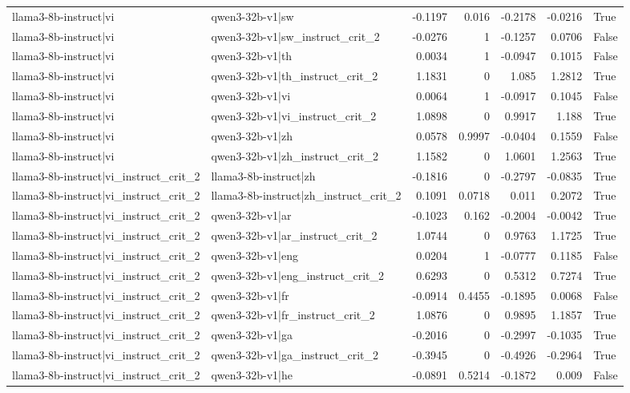 \begin{table}
\begin{tabular}{l l r r r r l}
llama3-8b-instruct|vi & qwen3-32b-v1|sw & -0.1197 & 0.016 & -0.2178 & -0.0216 & True \\
llama3-8b-instruct|vi & qwen3-32b-v1|sw_instruct_crit_2 & -0.0276 & 1 & -0.1257 & 0.0706 & False \\
llama3-8b-instruct|vi & qwen3-32b-v1|th & 0.0034 & 1 & -0.0947 & 0.1015 & False \\
llama3-8b-instruct|vi & qwen3-32b-v1|th_instruct_crit_2 & 1.1831 & 0 & 1.085 & 1.2812 & True \\
llama3-8b-instruct|vi & qwen3-32b-v1|vi & 0.0064 & 1 & -0.0917 & 0.1045 & False \\
llama3-8b-instruct|vi & qwen3-32b-v1|vi_instruct_crit_2 & 1.0898 & 0 & 0.9917 & 1.188 & True \\
llama3-8b-instruct|vi & qwen3-32b-v1|zh & 0.0578 & 0.9997 & -0.0404 & 0.1559 & False \\
llama3-8b-instruct|vi & qwen3-32b-v1|zh_instruct_crit_2 & 1.1582 & 0 & 1.0601 & 1.2563 & True \\
llama3-8b-instruct|vi_instruct_crit_2 & llama3-8b-instruct|zh & -0.1816 & 0 & -0.2797 & -0.0835 & True \\
llama3-8b-instruct|vi_instruct_crit_2 & llama3-8b-instruct|zh_instruct_crit_2 & 0.1091 & 0.0718 & 0.011 & 0.2072 & True \\
llama3-8b-instruct|vi_instruct_crit_2 & qwen3-32b-v1|ar & -0.1023 & 0.162 & -0.2004 & -0.0042 & True \\
llama3-8b-instruct|vi_instruct_crit_2 & qwen3-32b-v1|ar_instruct_crit_2 & 1.0744 & 0 & 0.9763 & 1.1725 & True \\
llama3-8b-instruct|vi_instruct_crit_2 & qwen3-32b-v1|eng & 0.0204 & 1 & -0.0777 & 0.1185 & False \\
llama3-8b-instruct|vi_instruct_crit_2 & qwen3-32b-v1|eng_instruct_crit_2 & 0.6293 & 0 & 0.5312 & 0.7274 & True \\
llama3-8b-instruct|vi_instruct_crit_2 & qwen3-32b-v1|fr & -0.0914 & 0.4455 & -0.1895 & 0.0068 & False \\
llama3-8b-instruct|vi_instruct_crit_2 & qwen3-32b-v1|fr_instruct_crit_2 & 1.0876 & 0 & 0.9895 & 1.1857 & True \\
llama3-8b-instruct|vi_instruct_crit_2 & qwen3-32b-v1|ga & -0.2016 & 0 & -0.2997 & -0.1035 & True \\
llama3-8b-instruct|vi_instruct_crit_2 & qwen3-32b-v1|ga_instruct_crit_2 & -0.3945 & 0 & -0.4926 & -0.2964 & True \\
llama3-8b-instruct|vi_instruct_crit_2 & qwen3-32b-v1|he & -0.0891 & 0.5214 & -0.1872 & 0.009 & False \\

\end{tabular}
\end{table}
